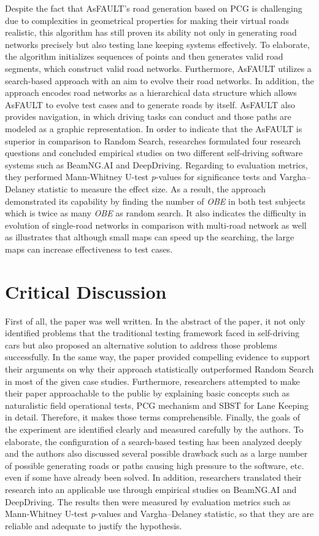 \documentclass[10pt,a4paper]{report}
\begin{document}
Despite the fact that AsFAULT’s road generation based on PCG is challenging due to complexities in geometrical properties for making their virtual roads realistic, 
this algorithm has still proven its ability not only in generating road networks precisely but also testing lane keeping systems effectively.
%
To elaborate, the algorithm initializes sequences of points and then generates valid road segments, which construct valid road networks.
%
Furthermore, AsFAULT utilizes a search-based approach with an aim to evolve their road networks.
%
In addition, the approach encodes road networks as a hierarchical data structure which allows AsFAULT to evolve test cases and to generate roads by itself.
%
AsFAULT also provides navigation, in which driving tasks can conduct and those paths are modeled as a graphic representation.
%
In order to indicate that the AsFAULT is superior in comparison to Random Search, researches formulated four research questions and concluded empirical studies on two different self-driving software systems such as BeamNG.AI and DeepDriving.
%
Regarding to evaluation metrics, they performed Mann-Whitney U-test \textit{p}-values for significance tests and Vargha–Delaney statistic to measure the effect size.
%
As a result, the approach demonstrated its capability by finding the number of \textit{OBE} in both test subjects which is twice as many \textit{OBE} as random search. It also indicates the difficulty in evolution of single-road networks in comparison with multi-road network as well as illustrates that although small maps can speed up the searching, the large maps can increase effectiveness to test cases.


\section{Critical Discussion}
First of all, the paper was well written. In the abstract of the paper, it not only identified problems that the traditional testing framework faced in self-driving cars but also proposed an alternative solution to address those problems successfully. In the same way, the paper provided compelling evidence to support their arguments on why their approach statistically outperformed Random Search in most of the given case studies. 
%
Furthermore, researchers attempted to make their paper approachable to the public by explaining basic concepts such as naturalistic field operational tests, PCG mechanism and SBST for Lane Keeping in detail. Therefore, it makes those terms comprehensible. 
%
Finally, the goals of the experiment are identified clearly and measured carefully by the authors. To elaborate, the configuration of a search-based testing has been analyzed deeply and the authors also discussed several possible drawback such as a large number of possible generating roads or paths causing high pressure to the software, etc. even if some have already been solved.
%
In addition, researchers translated their research into an applicable use through empirical studies on BeamNG.AI and DeepDriving. The results then were measured by evaluation metrics such as Mann-Whitney U-test \textit{p}-values and Vargha–Delaney statistic, so that they are are reliable and adequate to justify the hypothesis.
\end{document}
